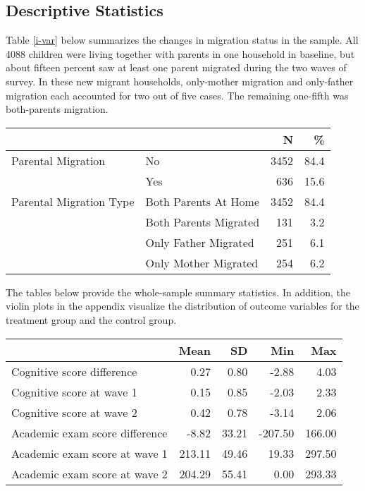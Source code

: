 \documentclass[
  man,floatsintext]{apa7}
\begin{document}
\hypertarget{descriptive-statistics}{%
\subsection{Descriptive Statistics}\label{descriptive-statistics}}

Table \ref{i-var} below summarizes the changes in migration status in the sample. All 4088 children were living together with parents in one household in baseline, but about fifteen percent saw at least one parent migrated during the two waves of survey. In these new migrant households, only-mother migration and only-father migration each accounted for two out of five cases. The remaining one-fifth was both-parents migration.

\begin{longtable}[]{@{}llrr@{}}
\toprule
& & N & \% \\
\midrule
\endhead
Parental Migration & No & 3452 & 84.4 \\
& Yes & 636 & 15.6 \\
Parental Migration Type & Both Parents At Home & 3452 & 84.4 \\
& Both Parents Migrated & 131 & 3.2 \\
& Only Father Migrated & 251 & 6.1 \\
& Only Mother Migrated & 254 & 6.2 \\
\bottomrule
\end{longtable}

The tables below provide the whole-sample summary statistics. In addition, the violin plots in the appendix visualize the distribution of outcome variables for the treatment group and the control group.

\begin{longtable}[]{@{}lrrrr@{}}
\toprule
& Mean & SD & Min & Max \\
\midrule
\endhead
Cognitive score difference & 0.27 & 0.80 & -2.88 & 4.03 \\
Cognitive score at wave 1 & 0.15 & 0.85 & -2.03 & 2.33 \\
Cognitive score at wave 2 & 0.42 & 0.78 & -3.14 & 2.06 \\
Academic exam score difference & -8.82 & 33.21 & -207.50 & 166.00 \\
Academic exam score at wave 1 & 213.11 & 49.46 & 19.33 & 297.50 \\
Academic exam score at wave 2 & 204.29 & 55.41 & 0.00 & 293.33 \\
\bottomrule
\end{longtable}
\end{document}
